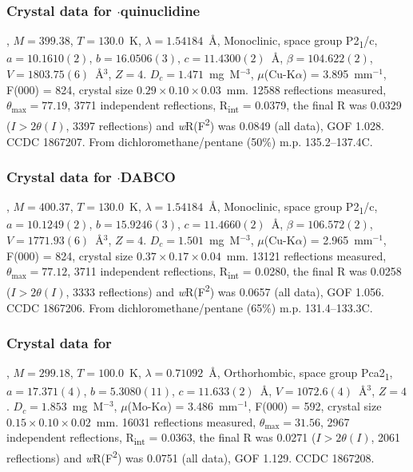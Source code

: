 \begin{refsection}
\subsubsection{Crystal data for $\cdot$quinuclidine}
, $M=399.38$, $T=130.0$~K, $\lambda=1.54184$~\AA, Monoclinic, space group P2\textsubscript{1}/c, $a = 10.1610(2)$, $b = 16.0506(3)$, $c = 11.4300(2)$~\AA, $\beta = 104.622(2)$\degree, $V = 1803.75(6)$~\AA$^{3}$, $Z = 4$.
$D_{c}= 1.471$~mg~M$^{-3}$, $\mu$(Cu-K$\alpha$) = 3.895~mm$^{-1}$, F(000) = 824, crystal size $0.29 \times 0.10 \times 0.03$~mm.
12588 reflections measured, $\theta_{\mathrm{max}} = 77.19$\degree, 3771 independent reflections, R\textsubscript{int} = 0.0379, the final R was 0.0329 ($I > 2\theta(I)$, 3397 reflections) and \emph{w}R(F\textsuperscript{2}) was 0.0849 (all data), GOF 1.028. 
CCDC 1867207. 
From dichloromethane/pentane (50\%) m.p. 135.2--137.4\degree C.

\subsubsection{Crystal data for $\cdot$DABCO}
, $M=400.37$, $T=130.0$~K, $\lambda=1.54184$~\AA, Monoclinic, space group P2\textsubscript{1}/c, $a = 10.1249(2)$, $b = 15.9246(3)$, $c = 11.4660(2)$~\AA, $\beta = 106.572(2)$\degree, $V = 1771.93(6)$~\AA$^{3}$, $Z = 4$.
$D_{c} = 1.501$~mg~M$^{-3}$, $\mu$(Cu-K$\alpha$) = 2.965~mm$^{-1}$, F(000) = 824, crystal size $0.37 \times 0.17 \times 0.04$~mm.
13121 reflections measured, $\theta_{\mathrm{max}} = 77.12$\degree, 3711 independent reflections, R\textsubscript{int} = 0.0280, the final R was 0.0258 ($I > 2\theta(I)$, 3333 reflections) and \emph{w}R(F\textsuperscript{2}) was 0.0657 (all data), GOF 1.056. 
CCDC 1867206. 
From dichloromethane/pentane (65\%) m.p. 131.4--133.3\degree C.

\subsubsection{Crystal data for }
, $M=299.18$, $T=100.0$~K, $\lambda=0.71092$~\AA, Orthorhombic, space group Pca2\textsubscript{1}, $a = 17.371(4)$, $b = 5.3080(11)$, $c = 11.633(2)$~\AA, $V = 1072.6(4)$~\AA$^{3}$, $Z = 4$.
$D_{c}= 1.853$~mg~M$^{-3}$, $\mu$(Mo-K$\alpha$) = 3.486~mm$^{-1}$, F(000) = 592, crystal size $0.15 \times 0.10 \times 0.02$~mm.
16031 reflections measured, $\theta_{\mathrm{max}}=31.56$\degree, 2967 independent reflections, R\textsubscript{int} = 0.0363, the final R was 0.0271 ($I > 2\theta(I)$, 2061 reflections) and \emph{w}R(F\textsuperscript{2}) was 0.0751 (all data), GOF 1.129. 
CCDC 1867208. 


\end{refsection}
